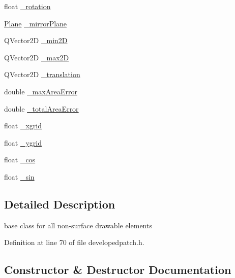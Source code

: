 \begin{DoxyCompactItemize}
\item 
float \hyperlink{classShipCAD_1_1DevelopedPatch_a811b2655727eb8af2e15e9eb48b54e89}{\+\_\+rotation}
\item 
\hyperlink{classShipCAD_1_1Plane}{Plane} \hyperlink{classShipCAD_1_1DevelopedPatch_a88ff1deb88a87de3e54de5169edb542a}{\+\_\+mirror\+Plane}
\item 
Q\+Vector2D \hyperlink{classShipCAD_1_1DevelopedPatch_a7fe7981020e5078148b87c9b0bab9075}{\+\_\+min2D}
\item 
Q\+Vector2D \hyperlink{classShipCAD_1_1DevelopedPatch_a2d4528866ab65f5e92a808c21134003e}{\+\_\+max2D}
\item 
Q\+Vector2D \hyperlink{classShipCAD_1_1DevelopedPatch_a58a7a720496ce4fe60118e4e6e477fdd}{\+\_\+translation}
\item 
double \hyperlink{classShipCAD_1_1DevelopedPatch_af180b25af9b064398ad1c08747589d78}{\+\_\+max\+Area\+Error}
\item 
double \hyperlink{classShipCAD_1_1DevelopedPatch_ace1b56968ee580af5a6776bdc5d67d59}{\+\_\+total\+Area\+Error}
\item 
float \hyperlink{classShipCAD_1_1DevelopedPatch_a573e309a7022ad3b2eef7441b1f9f663}{\+\_\+xgrid}
\item 
float \hyperlink{classShipCAD_1_1DevelopedPatch_a501d803bd3252e9949a521cdd6ccff7b}{\+\_\+ygrid}
\item 
float \hyperlink{classShipCAD_1_1DevelopedPatch_a3b00c2638e7bf0d281914bb61d7d9717}{\+\_\+cos}
\item 
float \hyperlink{classShipCAD_1_1DevelopedPatch_aad8361f99a45d4fa04450828e0e177d0}{\+\_\+sin}
\end{DoxyCompactItemize}


\subsection{Detailed Description}
base class for all non-\/surface drawable elements 

Definition at line 70 of file developedpatch.\+h.



\subsection{Constructor \& Destructor Documentation}
